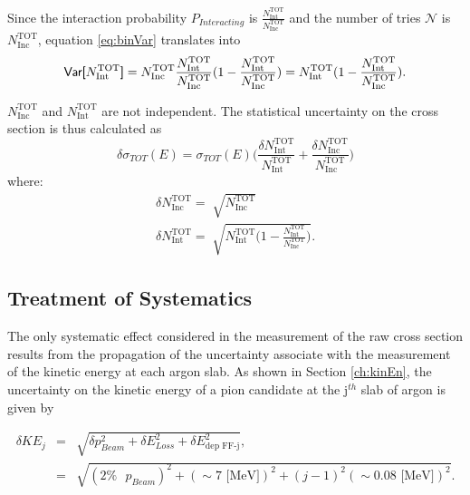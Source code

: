 Since the interaction probability $P_{Interacting}$ is $\frac{ N^{\text{TOT}}_{\text{Int}}}{N^{\text{TOT}}_{\text{Inc}}}$ and the number of tries $\mathcal{N}$ is $N^{\text{TOT}}_{\text{Inc}}$, equation \ref{eq:binVar} translates into
\begin{equation}
\text{\textsf{Var[}} N^{\text{TOT}}_{\text{Int}} \text{\textsf{]}}
= N^{\text{TOT}}_{\text{Inc}}\frac{ N^{\text{TOT}}_{\text{Int}}}{N^{\text{TOT}}_{\text{Inc}}} (1-\frac{ N^{\text{TOT}}_{\text{Int}}}{N^{\text{TOT}}_{\text{Inc}}}) = N^{\text{TOT}}_{\text{Int}}(1-\frac{ N^{\text{TOT}}_{\text{Int}}}{N^{\text{TOT}}_{\text{Inc}}}). 
\end{equation}

$N^{\text{TOT}}_{\text{Inc}}$ and $N^{\text{TOT}}_{\text{Int}}$ are not independent.
The statistical uncertainty on the cross section is thus calculated as 
\begin{equation}
\delta\sigma_{TOT}(E) = \sigma_{TOT}(E) \Big(\frac{\delta N^{\text{TOT}}_{\text{Int}}}{N^{\text{TOT}}_{\text{Int}}}+\frac{\delta N^{\text{TOT}}_{\text{Inc}}}{N^{\text{TOT}}_{\text{Inc}}}\Big) 
\end{equation}
where:
\begin{eqnarray}
\delta N^{\text{TOT}}_{\text{Inc}} = \sqrt[]{N^{\text{TOT}}_{\text{Inc}}} \\
\delta N^{\text{TOT}}_{\text{Int}} = \sqrt[]{N^{\text{TOT}}_{\text{Int}}\Big(1-\frac{ N^{\text{TOT}}_{\text{Int}}}{N^{\text{TOT}}_{\text{Inc}}}\Big)}.
\end{eqnarray}



\subsection{Treatment of Systematics} \label{ch:SysUncertaintyXSRaw}
The only systematic effect considered in the measurement of the raw cross section results from the propagation of the uncertainty associate with the measurement of the kinetic energy at each argon slab. As shown in Section \ref{ch:kinEn}, the uncertainty on the kinetic energy of a pion candidate at the j$^{th}$ slab of argon  is given by

\begin{eqnarray}
\delta KE_{j} &=& \sqrt{\delta p_{Beam}^2 + \delta E_{Loss}^2 +  \delta  E_{\text{dep FF-j}}^2},\\
&=& \sqrt{(2\% \text{ }p_{Beam})^2 +  (\sim 7 \text{ [MeV]})^2 +  (j-1)^2 (\sim0.08\text{ [MeV]})^2}.
\end{eqnarray}

